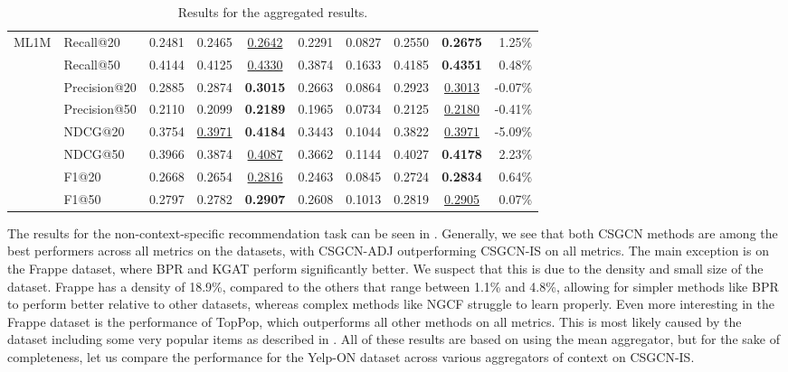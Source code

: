 \begin{table*}[]
{\begin{tabular}{@{}l|l|cccccc|cr@{}}
\multirow{8}{*}{ML1M}   & Recall@20    & 0.2481       & 0.2465       & {\ul {0.2642}}    & 0.2291 & 0.0827          & 0.2550 & \textbf{0.2675} & 1.25\% \\
                        & Recall@50    & 0.4144       & 0.4125       & {\ul {0.4330}}    & 0.3874 & 0.1633          & 0.4185 & \textbf{0.4351} & 0.48\% \\
                        & Precision@20 & 0.2885       & 0.2874       & \textbf{0.3015} & 0.2663 & 0.0864          & 0.2923 & {\ul {0.3013}}    & -0.07\% \\
                        & Precision@50 & 0.2110       & 0.2099       & \textbf{0.2189} & 0.1965 & 0.0734          & 0.2125 & {\ul {0.2180}}    & -0.41\% \\
                        & NDCG@20      & 0.3754       & {\ul{ 0.3971}} & \textbf{0.4184} & 0.3443 & 0.1044          & 0.3822 & {\ul {0.3971}}    & -5.09\% \\
                        & NDCG@50      & 0.3966       & 0.3874       & {\ul {0.4087}}    & 0.3662 & 0.1144          & 0.4027 & \textbf{0.4178} & 2.23\% \\
                        & F1@20        & 0.2668       & 0.2654       & {\ul{0.2816}}    & 0.2463 & 0.0845          & 0.2724 & \textbf{0.2834} & 0.64\% \\
                        & F1@50        & 0.2797       & 0.2782       & \textbf{0.2907} & 0.2608 & 0.1013          & 0.2819 & {\ul{0.2905}}    & 0.07\% \\ \bottomrule
\end{tabular}%
}
\caption{Results for the aggregated results.}
\label{tab:aggregatedresults}
\end{table*}
The results for the non-context-specific recommendation task can be seen in .
Generally, we see that both CSGCN methods are among the best performers across all metrics on the datasets, with CSGCN-ADJ outperforming CSGCN-IS on all metrics.
The main exception is on the Frappe dataset, where BPR and KGAT perform significantly better.
We suspect that this is due to the density and small size of the dataset.
Frappe has a density of 18.9\%, compared to the others that range between 1.1\% and 4.8\%, allowing for simpler methods like BPR to perform better relative to other datasets, whereas complex methods like NGCF struggle to learn properly.
Even more interesting in the Frappe dataset is the performance of TopPop, which outperforms all other methods on all metrics.
This is most likely caused by the dataset including some very popular items as described in .
All of these results are based on using the mean aggregator, but for the sake of completeness, let us compare the performance for the Yelp-ON dataset across various aggregators of context on CSGCN-IS.

